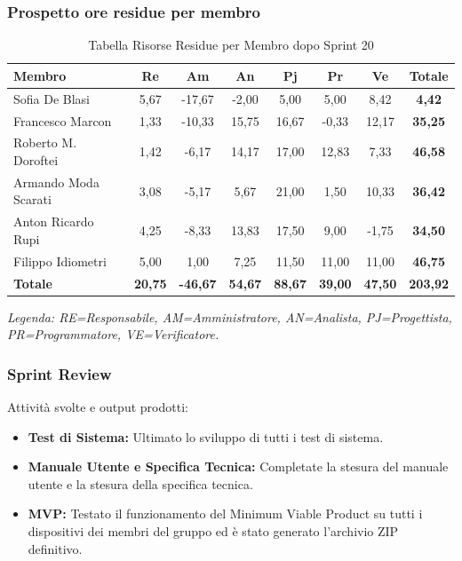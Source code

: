 \subsubsection{Prospetto ore residue per membro}
\begin{table}[H]
    \centering
    \renewcommand{\arraystretch}{1.3}
    \begin{tabularx}{\textwidth}{|X|c|c|c|c|c|c|c|}
        \hline
        \textbf{Membro} & \textbf{Re} & \textbf{Am} & \textbf{An} &
        \textbf{Pj} & \textbf{Pr} & \textbf{Ve} & \textbf{Totale} \\
        \hline
        Sofia De Blasi       &  5,67 & -17,67 &  -2,00 &  5,00 &  5,00 &  8,42 & \textbf{4,42} \\
        Francesco Marcon     &  1,33 & -10,33 &  15,75 & 16,67 & -0,33 & 12,17 & \textbf{35,25} \\
        Roberto M. Doroftei  &  1,42 &  -6,17 &  14,17 & 17,00 & 12,83 &  7,33 & \textbf{46,58} \\
        Armando Moda Scarati &  3,08 &  -5,17 &   5,67 & 21,00 &  1,50 & 10,33 & \textbf{36,42} \\
        Anton Ricardo Rupi   &  4,25 &  -8,33 &  13,83 & 17,50 &  9,00 & -1,75 & \textbf{34,50} \\
        Filippo Idiometri    &  5,00 &   1,00 &   7,25 & 11,50 & 11,00 & 11,00 & \textbf{46,75} \\
        \hline
        \textbf{Totale} &
        \textbf{20,75} & \textbf{-46,67} & \textbf{54,67} &
        \textbf{88,67} & \textbf{39,00} & \textbf{47,50} &
        \textbf{203,92} \\
        \hline
    \end{tabularx}
    \begin{minipage}{\textwidth}
        \smallskip
        \footnotesize\textit{Legenda: RE=Responsabile, AM=Amministratore,
        AN=Analista, PJ=Progettista, PR=Programmatore, VE=Verificatore.}
    \end{minipage}
    \caption{Tabella Risorse Residue per Membro dopo Sprint 20}
\end{table}

\subsubsection{Sprint Review}
Attività svolte e output prodotti:
\begin{itemize}
    \item \textbf{Test di Sistema:} Ultimato lo sviluppo di tutti i test di sistema.
    \item \textbf{Manuale Utente e Specifica Tecnica:} Completate la stesura del manuale utente e la stesura della specifica tecnica.
    \item \textbf{MVP:} Testato il funzionamento del Minimum Viable Product su tutti i dispositivi dei membri del gruppo ed è stato generato l'archivio ZIP definitivo.
\end{itemize}

